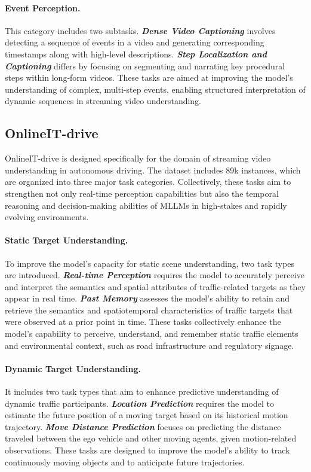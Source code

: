 \paragraph{Event Perception.} This category includes two subtasks. \textbf{\textit{Dense Video Captioning}} involves detecting a sequence of events in a video and generating corresponding timestamps along with high-level descriptions. \textbf{\textit{Step Localization and Captioning}} differs by focusing on segmenting and narrating key procedural steps within long-form videos. These tasks are aimed at improving the model’s understanding of complex, multi-step events, enabling structured interpretation of dynamic sequences in streaming video understanding.


\subsection{OnlineIT-drive}
\label{app:sec:Details_of_OnlineIT:OnlineIT-drive}
OnlineIT-drive is designed specifically for the domain of streaming video understanding in autonomous driving. The dataset includes 89k instances, which are organized into three major task categories. Collectively, these tasks aim to strengthen not only real-time perception capabilities but also the temporal reasoning and decision-making abilities of MLLMs in high-stakes and rapidly evolving environments.

\paragraph{Static Target Understanding.}
To improve the model’s capacity for static scene understanding, two task types are introduced. \textit{\textbf{Real-time Perception}} requires the model to accurately perceive and interpret the semantics and spatial attributes of traffic-related targets as they appear in real time. \textit{\textbf{Past Memory}} assesses the model’s ability to retain and retrieve the semantics and spatiotemporal characteristics of traffic targets that were observed at a prior point in time. These tasks collectively enhance the model’s capability to perceive, understand, and remember static traffic elements and environmental context, such as road infrastructure and regulatory signage.

\paragraph{Dynamic Target Understanding.}
It includes two task types that aim to enhance predictive understanding of dynamic traffic participants. \textit{\textbf{Location Prediction}} requires the model to estimate the future position of a moving target based on its historical motion trajectory. \textit{\textbf{Move Distance Prediction}} focuses on predicting the distance traveled between the ego vehicle and other moving agents, given motion-related observations. These tasks are designed to improve the model’s ability to track continuously moving objects and to anticipate future trajectories.

